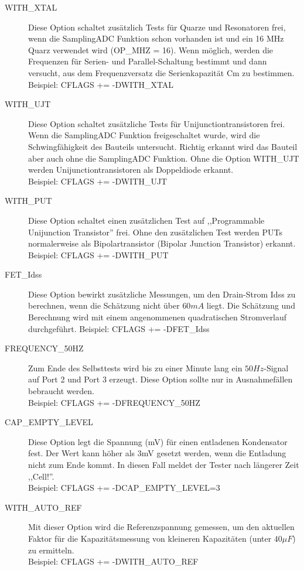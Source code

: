 \begin{description}
  \item[WITH\_XTAL]
Diese Option schaltet zusätzlich Tests für Quarze und Resonatoren frei, wenn die SamplingADC Funktion schon vorhanden ist
und ein 16 MHz Quarz verwendet wird (OP\_MHZ = 16).
Wenn möglich, werden die Frequenzen für Serien- und Parallel-Schaltung bestimmt und dann versucht,
aus dem Frequenzversatz die Serienkapazität Cm zu bestimmen.\\
Beispiel: CFLAGS += -DWITH\_XTAL

  \item[WITH\_UJT]
Diese Option schaltet zusätzliche Tests für Unijunctiontransistoren frei. 
Wenn die SamplingADC Funktion freigeschaltet wurde, wird die Schwingfähigkeit des Bauteils untersucht.
Richtig erkannt wird das Bauteil aber auch ohne die SamplingADC Funktion. 
Ohne die Option WITH\_UJT werden Unijunctiontransistoren als Doppeldiode erkannt.\\
Beispiel: CFLAGS += -DWITH\_UJT

  \item[WITH\_PUT]
Diese Option schaltet einen zusätzlichen Test auf ,,Programmable Unijunction Transistor'' frei.
Ohne den zusätzlichen Test werden PUTs normalerweise als Bipolartransistor (Bipolar Junction Transistor) erkannt.\\
Beispiel: CFLAGS += -DWITH\_PUT

 \item[FET\_Idss]
Diese Option bewirkt zusätzliche Messungen, um den Drain-Strom Idss zu berechnen, wenn die Schätzung nicht
über \(60mA\) liegt. Die Schätzung und Berechnung wird mit einem angenommenen quadratischen Stromverlauf durchgeführt.
Beispiel: CFLAGS += -DFET\_Idss

  \item[FREQUENCY\_50HZ] Zum Ende des Selbsttests wird bis zu einer Minute lang ein \(50Hz\)-Signal auf Port 2 und Port 3 erzeugt.
Diese Option sollte nur in Ausnahmefällen bebraucht werden.\\
Beispiel: CFLAGS += -DFREQUENCY\_50HZ

  \item[CAP\_EMPTY\_LEVEL] Diese Option legt die Spannung (mV) für einen entladenen Kondensator fest.
Der Wert kann höher als 3mV gesetzt werden, wenn die Entladung nicht zum Ende kommt. In diesen Fall meldet der Tester nach längerer Zeit ,,Cell!''.\\
Beispiel: CFLAGS += -DCAP\_EMPTY\_LEVEL=3

  \item[WITH\_AUTO\_REF] Mit dieser Option wird die Referenzspannung gemessen, um den aktuellen Faktor für die Kapazitätsmessung 
von kleineren Kapazitäten (unter \(40\mu F\)) zu ermitteln.\\
Beispiel: CFLAGS += -DWITH\_AUTO\_REF


\end{description}
